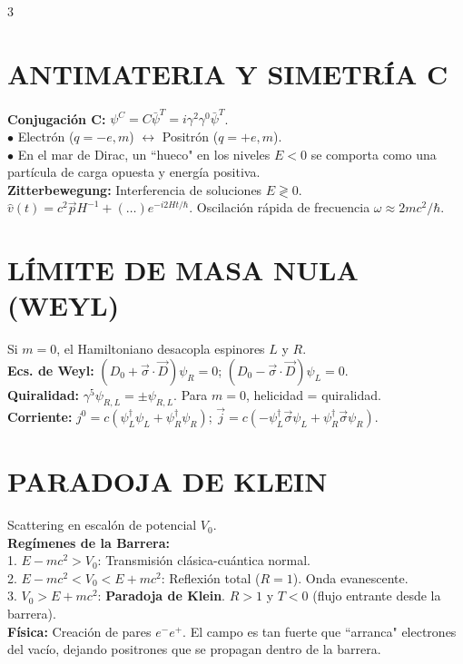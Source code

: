 \documentclass[8pt,a4paper,fleqn]{extarticle} %
\begin{document}
\begin{multicols}{3}
\section{ANTIMATERIA Y SIMETRÍA C}
\textbf{Conjugación C:} $\psi^C = C \bar{\psi}^T = i\gamma^2 \gamma^0 \bar{\psi}^T$.
\\$\bullet$ Electrón ($q=-e, m$) $\leftrightarrow$ Positrón ($q=+e, m$).
\\$\bullet$ En el mar de Dirac, un ``hueco" en los niveles $E < 0$ se comporta como una partícula de carga opuesta y energía positiva.
\\\textbf{Zitterbewegung:} Interferencia de soluciones $E \gtrless 0$.
$\hat{v}(t) = c^2 \vec{p} H^{-1} + (\dots) e^{-i 2 H t/\hbar}$. Oscilación rápida de frecuencia $\omega \approx 2mc^2/\hbar$.

\section{LÍMITE DE MASA NULA (WEYL)}
Si $m=0$, el Hamiltoniano desacopla espinores $L$ y $R$.
\\\textbf{Ecs. de Weyl:} $(D_0 + \vec{\sigma}\cdot\vec{D})\psi_R = 0$; $(D_0 - \vec{\sigma}\cdot\vec{D})\psi_L = 0$.
\\\textbf{Quiralidad:} $\gamma^5 \psi_{R,L} = \pm \psi_{R,L}$. Para $m=0$, helicidad = quiralidad.
\\\textbf{Corriente:} $j^0 = c(\psi_L^\dagger \psi_L + \psi_R^\dagger \psi_R)$; $\vec{j} = c(-\psi_L^\dagger \vec{\sigma} \psi_L + \psi_R^\dagger \vec{\sigma} \psi_R)$.

\section{PARADOJA DE KLEIN}
Scattering en escalón de potencial $V_0$.
\\\textbf{Regímenes de la Barrera:}
\\1. $E - mc^2 > V_0$: Transmisión clásica-cuántica normal.
\\2. $E - mc^2 < V_0 < E + mc^2$: Reflexión total ($R=1$). Onda evanescente.
\\3. $V_0 > E + mc^2$: \textbf{Paradoja de Klein}. $R > 1$ y $T < 0$ (flujo entrante desde la barrera).
\\\textbf{Física:} Creación de pares $e^- e^+$. El campo es tan fuerte que ``arranca" electrones del vacío, dejando positrones que se propagan dentro de la barrera.


\end{multicols}
\end{document}
